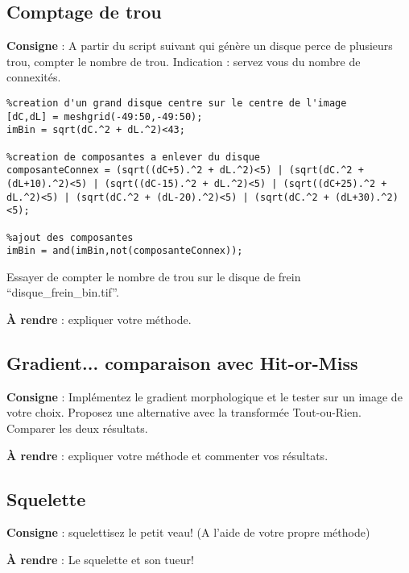 \documentclass[10pt,a4paper]{article}
\begin{document}
\subsection{Comptage de trou}
\textbf{Consigne} : A partir du script suivant qui g\'{e}n\`{e}re un disque perce de plusieurs trou, compter le nombre de trou. Indication : servez vous du nombre de connexit\'{e}s.
\begin{verbatim}
%creation d'un grand disque centre sur le centre de l'image
[dC,dL] = meshgrid(-49:50,-49:50);
imBin = sqrt(dC.^2 + dL.^2)<43;

%creation de composantes a enlever du disque
composanteConnex = (sqrt((dC+5).^2 + dL.^2)<5) | (sqrt(dC.^2 + (dL+10).^2)<5) | (sqrt((dC-15).^2 + dL.^2)<5) | (sqrt((dC+25).^2 + dL.^2)<5) | (sqrt(dC.^2 + (dL-20).^2)<5) | (sqrt(dC.^2 + (dL+30).^2)<5);

%ajout des composantes
imBin = and(imBin,not(composanteConnex));
\end{verbatim}
Essayer de compter le nombre de trou sur le disque de frein ``disque\_frein\_bin.tif''.

\noindent\textbf{\`{A} rendre} : expliquer votre m\'{e}thode.

\subsection{Gradient... comparaison avec Hit-or-Miss}
\textbf{Consigne} : Impl\'{e}mentez le gradient morphologique et le tester sur un image de votre choix. Proposez une alternative avec la transform\'{e}e Tout-ou-Rien. Comparer les deux r\'{e}sultats.

\noindent\textbf{\`{A} rendre} : expliquer votre m\'{e}thode et commenter vos r\'{e}sultats.

\subsection{Squelette}
\textbf{Consigne} : squelettisez le petit veau! (A l'aide de votre propre m\'{e}thode)

\noindent\textbf{\`{A} rendre} : Le squelette et son  tueur!






\end{document}
